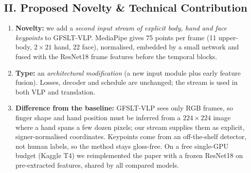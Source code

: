 \documentclass[8pt,a4paper]{article}
\begin{document}
\subsection*{II. Proposed Novelty \& Technical Contribution}
\begin{enumerate}
    \item \textbf{Novelty:} we add a \emph{second input stream of explicit body, hand and face keypoints} to GFSLT-VLP. MediaPipe gives 75 points per frame (11 upper-body, $2\times21$ hand, 22 face), normalised, embedded by a small network and fused with the ResNet18 frame features before the temporal blocks.
    \item \textbf{Type:} an \emph{architectural modification} (a new input module plus early feature fusion). Losses, decoder and schedule are unchanged; the stream is used in both VLP and translation.
    \item \textbf{Difference from the baseline:} GFSLT-VLP sees only RGB frames, so finger shape and hand position must be inferred from a $224\times224$ image where a hand spans a few dozen pixels; our stream supplies them as explicit, signer-normalised coordinates. Keypoints come from an off-the-shelf detector, not human labels, so the method stays gloss-free. On a free single-GPU budget (Kaggle T4) we reimplemented the paper with a frozen ResNet18 on pre-extracted features, shared by all compared models.
\end{enumerate}

\end{document}
